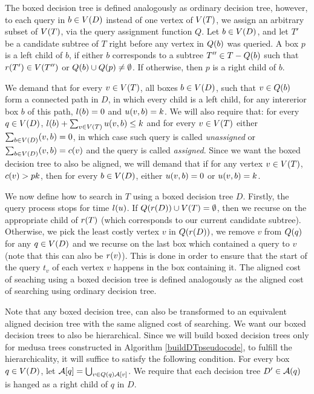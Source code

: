 The boxed decision tree is defined analogously as ordinary decision tree, however, to each query in $b\in V\mathopen{}\left( D \right)$ instead of one vertex of $V\mathopen{}\left( T \right)$, we assign an arbitrary subset of $V\mathopen{}\left( T \right)$, via the query assignment function $Q$. Let $b\in V\mathopen{}\left( D \right)$, and let $T'$ be a candidate subtree of $T$ right before any vertex in $Q\mathopen{}\left( b \right)$ was queried. A box $p$ is a left child of $b$, if either $b$ corresponds to a subtree $T''\in T-Q\mathopen{}\left( b \right)$ such that $r\mathopen{}\left( T' \right)\in V\mathopen{}\left( T'' \right)$ or $Q\mathopen{}\left( b \right)\cup Q\mathopen{}\left( p \right)\neq \emptyset$. If otherwise, then $p$ is a right child of $b$.

We demand that for every $v\in V\mathopen{}\left( T \right)$, all boxes $b\in V\mathopen{}\left( D \right)$, such that $v\in Q\mathopen{}\left( b \right)$ form a connected path in $D$, in which every child is a left child, for any intererior box $b$ of this path, $l\mathopen{}\left( b \right)=0$ and $u\mathopen{}\left( v,b \right)=k$. We will also require that: for every $q\in V\mathopen{}\left( D \right)$, $l\mathopen{}\left( b \right)+\sum_{v\in V\mathopen{}\left( T \right)}u\mathopen{}\left( v,b \right)\leq k$ and for every $v\in V\mathopen{}\left( T \right)$ either $\sum_{b\in V\mathopen{}\left( D \right)}\mathopen{}\left( v,b \right)=0$, in which case such query is called \textit{unassigned} or $\sum_{b\in V\mathopen{}\left( D \right)}\mathopen{}\left( v,b \right)=c\mathopen{}\left( v \right)$ and the query is called \textit{assigned}. Since we want the boxed decision tree to also be aligned, we will demand that if for any vertex $v\in V\mathopen{}\left( T \right)$, $c\mathopen{}\left( v \right)>pk$, then for every $b\in V\mathopen{}\left( D \right)$, either $u\mathopen{}\left( v,b \right)=0$ or $u\mathopen{}\left( v,b \right)=k$. 

We now define how to search in $T$ using a boxed decision tree $D$. Firstly, the query process stops for time $l\mathopen{}\left( u \right)$. If $Q\mathopen{}\left( r\mathopen{}\left( D \right) \right)\cup V\mathopen{}\left( T \right) = \emptyset$, then we recurse on the appropriate child of $r\mathopen{}\left( T \right)$ (which corresponds to our current candidate subtree). Otherwise, we pick the least costly vertex $v$ in $Q\mathopen{}\left( r\mathopen{}\left( D \right) \right)$, we remove $v$ from $Q\mathopen{}\left( q \right)$ for any $q\in V\mathopen{}\left( D \right)$ and we recurse on the last box which contained a query to $v$ (note that this can also be $r\mathopen{}\left( v \right)$). This is done in order to ensure that the start of the query $t_v$ of each vertex $v$ happens in the box containing it. The aligned cost of seaching using a boxed decision tree is defined analogously as the aligned cost of searching using ordinary decision tree.



Note that any boxed decision tree, can also be transformed to an equivalent aligned decision tree with the same aligned cost of searching. We want our boxed decision trees to also be hierarchical. Since we will build boxed decision trees only for medusa trees constructed in Algorithm \ref{buildDTpseudocode}, to fulfill the hierarchicality, it will suffice to satisfy the following condition. For every box $q\in V\mathopen{}\left( D \right)$, let $\mathcal{A}[q]=\bigcup_{v\in Q\mathopen{}\left( q \right)\mathcal{A}[v]}$. We require that each decision tree $D'\in \mathcal{A}\mathopen{}\left( q \right)$ is hanged as a right child of $q$ in $D$.

